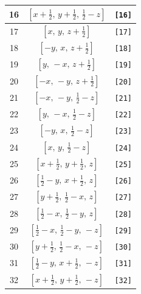 \documentclass[fleqn,8pt]{jsarticle}
\begin{document}
\begin{longtable}{ccc}
16 & $\left[ x + \frac{1}{2},\, y + \frac{1}{2},\, \frac{1}{2} - z \right]$ & {\tt [16]} \\ \hline
17 & $\left[ x,\, y,\, z + \frac{1}{2} \right]$ & {\tt [17]} \\ \hline
18 & $\left[ - y,\, x,\, z + \frac{1}{2} \right]$ & {\tt [18]} \\ \hline
19 & $\left[ y,\, - x,\, z + \frac{1}{2} \right]$ & {\tt [19]} \\ \hline
20 & $\left[ - x,\, - y,\, z + \frac{1}{2} \right]$ & {\tt [20]} \\ \hline
21 & $\left[ - x,\, - y,\, \frac{1}{2} - z \right]$ & {\tt [21]} \\ \hline
22 & $\left[ y,\, - x,\, \frac{1}{2} - z \right]$ & {\tt [22]} \\ \hline
23 & $\left[ - y,\, x,\, \frac{1}{2} - z \right]$ & {\tt [23]} \\ \hline
24 & $\left[ x,\, y,\, \frac{1}{2} - z \right]$ & {\tt [24]} \\ \hline
25 & $\left[ x + \frac{1}{2},\, y + \frac{1}{2},\, z \right]$ & {\tt [25]} \\ \hline
26 & $\left[ \frac{1}{2} - y,\, x + \frac{1}{2},\, z \right]$ & {\tt [26]} \\ \hline
27 & $\left[ y + \frac{1}{2},\, \frac{1}{2} - x,\, z \right]$ & {\tt [27]} \\ \hline
28 & $\left[ \frac{1}{2} - x,\, \frac{1}{2} - y,\, z \right]$ & {\tt [28]} \\ \hline
29 & $\left[ \frac{1}{2} - x,\, \frac{1}{2} - y,\, - z \right]$ & {\tt [29]} \\ \hline
30 & $\left[ y + \frac{1}{2},\, \frac{1}{2} - x,\, - z \right]$ & {\tt [30]} \\ \hline
31 & $\left[ \frac{1}{2} - y,\, x + \frac{1}{2},\, - z \right]$ & {\tt [31]} \\ \hline
32 & $\left[ x + \frac{1}{2},\, y + \frac{1}{2},\, - z \right]$ & {\tt [32]} \\
\end{longtable}
\end{document}
